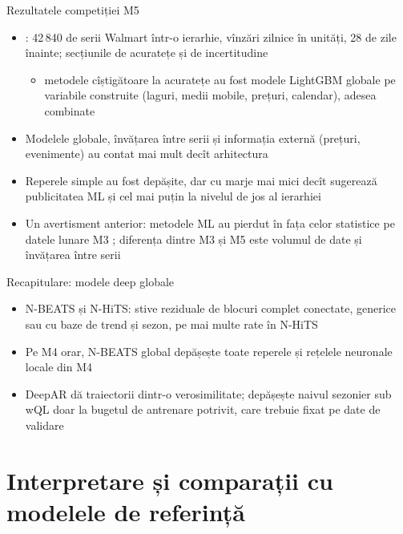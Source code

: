 \begin{frame}{Rezultatele competiției M5}
\itemsize{\small}
\begin{itemize}
    \item {}: 42\,840 de serii Walmart într-o ierarhie, vînzări zilnice în unități, 28 de zile înainte; secțiunile de acuratețe și de incertitudine
    \begin{itemize}
        \item metodele cîștigătoare la acuratețe au fost modele LightGBM globale pe variabile construite (laguri, medii mobile, prețuri, calendar), adesea combinate
    \end{itemize}
    \item Modelele globale, învățarea între serii și informația externă (prețuri, evenimente) au contat mai mult decît arhitectura
    \item Reperele simple au fost depășite, dar cu marje mai mici decît sugerează publicitatea ML și cel mai puțin la nivelul de jos al ierarhiei
    \item Un avertisment anterior: metodele ML au pierdut în fața celor statistice pe datele lunare M3 ; diferența dintre M3 și M5 este volumul de date și învățarea între serii
\end{itemize}
\end{frame}

\begin{frame}{Recapitulare: modele deep globale}
\itemsize{\small}
\begin{itemize}
    \item N-BEATS și N-HiTS: stive reziduale de blocuri complet conectate, generice sau cu baze de trend și sezon, pe mai multe rate în N-HiTS
    \item Pe M4 orar, N-BEATS global depășește toate reperele și rețelele neuronale locale din M4
    \item DeepAR dă traiectorii dintr-o verosimilitate; depășește naivul sezonier sub wQL doar la bugetul de antrenare potrivit, care trebuie fixat pe date de validare
\end{itemize}
\end{frame}


\section{Interpretare și comparații cu modelele de referință}

